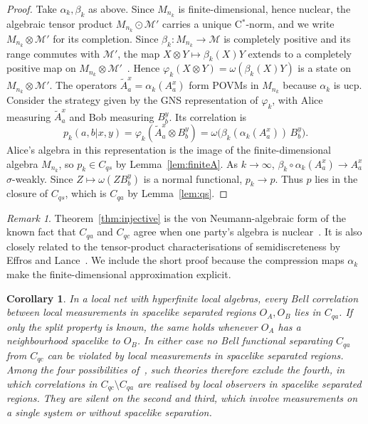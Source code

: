\documentclass[11pt]{article}
\newtheorem{corollary}{Corollary}[section]
\theoremstyle{definition}\newtheorem{definition}{Definition}[section]
\theoremstyle{remark}\newtheorem*{remark}{Remark}
\newcommand{\M}{\mathcal M}
\newcommand{\Cqa}{C_{qa}}
\newcommand{\Cqs}{C_{qs}}
\newcommand{\Cqc}{C_{qc}}
\begin{document}
\begin{proof}
Take $\alpha_k,\beta_k$ as above. Since $M_{n_k}$ is finite-dimensional, hence nuclear, the algebraic tensor product
$M_{n_k}\odot\M'$ carries a unique C$^*$-norm, and we write $M_{n_k}\otimes\M'$ for its completion. Since $\beta_k:M_{n_k}\to\M$ is
completely positive and its range commutes with $\M'$, the map $X\otimes Y\mapsto\beta_k(X)Y$ extends to a completely positive map on
$M_{n_k}\otimes\M'$~\cite{Paulsen}. Hence
$\varphi_k(X\otimes Y)=\omega(\beta_k(X)Y)$ is a state on $M_{n_k}\otimes\M'$. The operators $\tilde A^x_a=\alpha_k(A^x_a)$ form POVMs in $M_{n_k}$ because
$\alpha_k$ is ucp. Consider the strategy given by the GNS representation of $\varphi_k$, with Alice measuring $\tilde A^x_a$ and Bob
measuring $B^y_b$. Its correlation is
\begin{equation}
p_k(a,b|x,y)=\varphi_k(\tilde A^x_a\otimes B^y_b)=\omega\bigl(\beta_k(\alpha_k(A^x_a))\,B^y_b\bigr).
\end{equation}
Alice's algebra in this representation is the image of the finite-dimensional algebra $M_{n_k}$, so $p_k\in\Cqs$ by
Lemma~\ref{lem:finiteA}. As $k\to\infty$, $\beta_k\circ\alpha_k(A^x_a)\to A^x_a$ $\sigma$-weakly. Since $Z\mapsto\omega(ZB^y_b)$ is a normal functional,
$p_k\to p$. Thus $p$ lies in the closure of $\Cqs$, which is $\Cqa$ by Lemma~\ref{lem:qs}.
\end{proof}

\begin{remark}
Theorem~\ref{thm:injective} is the von Neumann-algebraic form of the known fact that $\Cqa$ and $\Cqc$ agree when one
party's algebra is nuclear~\cite{ScholzWerner,CabelloQuintinoKleinmann}. It is also closely related to the
tensor-product characterisations of semidiscreteness by Effros and Lance~\cite{EffrosLance}. We include the short proof because the compression maps $\alpha_k$ make the finite-dimensional
approximation explicit.
\end{remark}

\begin{corollary}
\label{cor:qft}
In a local net with hyperfinite local algebras, every Bell correlation between local measurements in spacelike
separated regions $O_A,O_B$ lies in $\Cqa$. If only the split property is known, the same holds whenever $O_A$ has a
neighbourhood spacelike to $O_B$. In either case no Bell functional separating $\Cqa$ from $\Cqc$ can be violated by local
measurements in spacelike separated regions. Among the four possibilities of~\cite{CabelloQuintinoKleinmann}, such
theories therefore exclude the fourth, in which correlations in $\Cqc\setminus\Cqa$ are realised by local observers in spacelike
separated regions. They
are silent on the second and third, which involve measurements on a single system or without spacelike separation.
\end{corollary}
\end{document}

